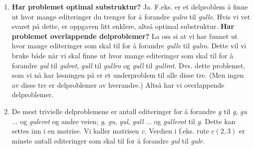 \begin{enumerate}
    \item \textbf{Har problemet optimal substruktur?} Ja. F.eks. er et delproblem å finne ut hvor mange editeringer du trenger for å forandre \textit{gulro} til \textit{gulle}. Hvis vi vet svaret på dette, er oppgaven litt enklere, altså optimal substruktur.\newline
    \textbf{Har problemet overlappende delproblemer?} La oss si at vi har funnet ut hvor mange editeringer som skal til for å forandre \textit{gulle} til \textit{gulro}. Dette vil vi bruke både når vi skal finne ut hvor mange editeringer som skal til for å forandre \textit{gul} til \textit{gulrot}, \textit{gull} til \textit{gullro} og \textit{gull} til \textit{gullrot}. Dvs. dette problemet, som vi nå har løsningen på er et underproblem til alle disse tre. (Men ingen av disse tre er delproblemer av hverandre.) Altså har vi overlappende delproblemer.
    
    \item De mest trivielle delproblemene er antall editeringer for å forandre \textit{g} til \textit{g}, \textit{gu} ... og \textit{gulerot} og andre veien; \textit{g}, \textit{gu}, \textit{gul}, \textit{gull} ... og \textit{gullerot} til \textit{g}.\newline
    \newline
    Dette kan settes inn i en matrise. Vi kaller matrisen \textit{c}. Verdien i f.eks. rute $c(2,3)$ er minste antall editeringer som skal til for å forandre \textit{gul} til \textit{gulr}.
    

\end{enumerate}
